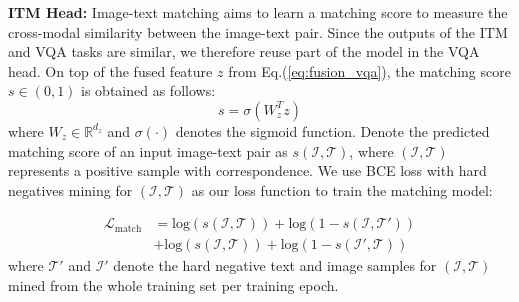 \documentclass[sigconf]{acmart}
\begin{document}
\noindent\textbf{ITM Head:} Image-text matching aims to learn a matching score to measure the cross-modal similarity between the image-text pair. Since the outputs of the ITM and VQA tasks are similar, we therefore reuse part of the model in the VQA head. On top of the fused feature $z$ from Eq.(\ref{eq:fusion_vqa}), the matching score $s\in(0,1)$ is obtained as follows:
\begin{equation}\label{eq:fusion_itm}
s = \sigma(W_z^Tz)
\end{equation}
where $W_z\in\mathbb{R}^{d_z}$ and $\sigma(\cdot)$ denotes the sigmoid function. Denote the predicted matching score of an input image-text pair as $s(\mathcal{I},\mathcal{T})$, where $(\mathcal{I},\mathcal{T})$ represents a positive sample with correspondence. We use BCE loss with hard negatives mining for $(\mathcal{I},\mathcal{T})$ as our loss function to train the matching model:



\begin{equation}\label{eq:loss_itmhead}
\begin{aligned}
 \mathcal{L}_\mathrm{match}&= \mathrm{log}(s(\mathcal{I},\mathcal{T})) +\mathrm{log}(1-s(\mathcal{I},\mathcal{T'}))\\
&+\mathrm{log}(s(\mathcal{I},\mathcal{T})) +\mathrm{log}(1-s(\mathcal{I'},\mathcal{T}))
\end{aligned}
\end{equation}
where $\mathcal{T'}$ and $\mathcal{I'}$ denote the hard negative text and image samples for $(\mathcal{I},\mathcal{T})$ mined from the whole training set per training epoch.
\end{document}
